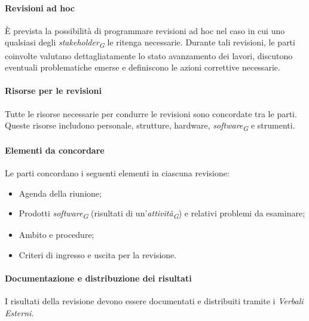 \paragraph{Revisioni ad hoc}
È prevista la possibilità di programmare revisioni ad hoc nel caso in cui uno qualsiasi degli \textit{stakeholder}\textsubscript{\textit{G}} le ritenga necessarie.
Durante tali revisioni, le parti coinvolte valutano dettagliatamente lo stato avanzamento dei lavori, discutono eventuali problematiche emerse e definiscono le azioni correttive necessarie.

\paragraph{Risorse per le revisioni}
Tutte le risorse necessarie per condurre le revisioni sono concordate tra le parti. Queste risorse includono personale, strutture, hardware, \textit{software}\textsubscript{\textit{G}} e strumenti.

\paragraph{Elementi da concordare}
Le parti concordano i seguenti elementi in ciascuna revisione: 
\begin{itemize}
    \item Agenda della riunione;
    \item Prodotti \textit{software}\textsubscript{\textit{G}} (risultati di un'\textit{attività}\textsubscript{\textit{G}}) e relativi problemi da esaminare;
    \item Ambito e procedure;
    \item Criteri di ingresso e uscita per la revisione.
\end{itemize}


\paragraph{Documentazione e distribuzione dei risultati}
I risultati della revisione devono essere documentati e distribuiti tramite i \textit{Verbali Esterni}.

